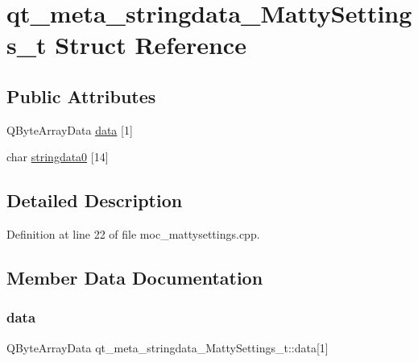 \hypertarget{structqt__meta__stringdata__MattySettings__t}{}\section{qt\+\_\+meta\+\_\+stringdata\+\_\+\+Matty\+Settings\+\_\+t Struct Reference}
\label{structqt__meta__stringdata__MattySettings__t}
\subsection*{Public Attributes}
\begin{DoxyCompactItemize}
\item 
Q\+Byte\+Array\+Data \hyperlink{structqt__meta__stringdata__MattySettings__t_a21ceabaf46b7bdaf93a6bc397af56aaa}{data} \mbox{[}1\mbox{]}
\item 
char \hyperlink{structqt__meta__stringdata__MattySettings__t_a43a73d36a65041d9e497357ede476017}{stringdata0} \mbox{[}14\mbox{]}
\end{DoxyCompactItemize}


\subsection{Detailed Description}


Definition at line 22 of file moc\+\_\+mattysettings.\+cpp.



\subsection{Member Data Documentation}
\hypertarget{structqt__meta__stringdata__MattySettings__t_a21ceabaf46b7bdaf93a6bc397af56aaa}{}\label{structqt__meta__stringdata__MattySettings__t_a21ceabaf46b7bdaf93a6bc397af56aaa} 
\subsubsection{\texorpdfstring{data}{data}}
{\footnotesize\ttfamily Q\+Byte\+Array\+Data qt\+\_\+meta\+\_\+stringdata\+\_\+\+Matty\+Settings\+\_\+t\+::data\mbox{[}1\mbox{]}}



